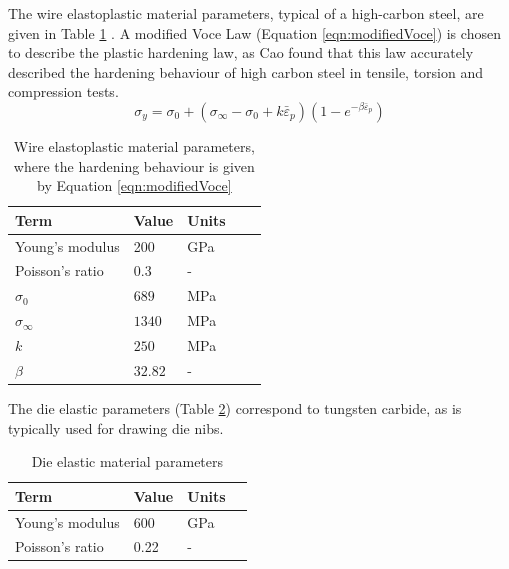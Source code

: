 \documentclass[sn-mathphys,Numbered]{sn-jnl}%
\begin{document}
The wire elastoplastic material parameters, typical of a high-carbon steel, are given in Table \ref{tab:wire_draw_material_properties} \citep{clancy_improving_2019}.
A modified Voce Law \cite{cao_modelling_2014} (Equation \ref{eqn:modifiedVoce}) is chosen to describe the plastic hardening law, as Cao \cite{cao_modelling_2014} found that this law accurately described the hardening behaviour of high carbon steel in tensile, torsion and compression tests.
\begin{equation} \label{eqn:modifiedVoce}
    \sigma_y=\sigma_{0} + (\sigma_{\infty} - \sigma_{0} + k\bar{\varepsilon}_p)(1 - e^{-\beta\bar{\varepsilon}_p})
\end{equation}
\begin{table}[htb]
	\centering
		\begin{tabular}{lllll} \hline
			Term  & Value & Units  \\ \hline 
			Young's modulus & 200  & GPa \\
			Poisson's ratio & 0.3 & -  \\
			$\sigma_0$ & $689$ & MPa  \\
			$\sigma_\infty$ & $1340$ & MPa  \\
			$k$ & $250$ & MPa  \\
			$\beta$ & $32.82$ & -  \\
			\hline
		\end{tabular}
	\caption{Wire elastoplastic material parameters, where the hardening behaviour is given by Equation \ref{eqn:modifiedVoce}}
	\label{tab:wire_draw_material_properties}
\end{table}
The die elastic parameters (Table \ref{tab:die_draw_material_properties}) correspond to tungsten carbide, as is typically used for drawing die nibs.
\begin{table}[htb]
	\centering
		\begin{tabular}{llll} \hline
			Term  & Value & Units \\ \hline 
            		Young's modulus & 600 & GPa \\
			Poisson's ratio & 0.22 & -  \\
			\hline
		\end{tabular}
	\caption{Die elastic material parameters}
	\label{tab:die_draw_material_properties}
\end{table}
\end{document}
